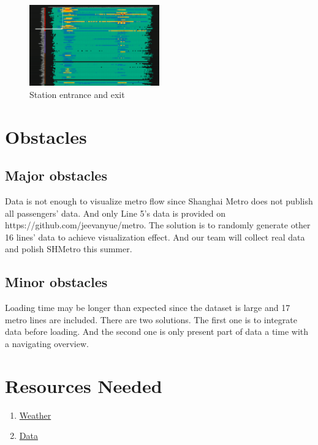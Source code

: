 \documentclass{proc}
\begin{document}
\begin{figure}[t]
	\centering
	\includegraphics[width=0.5\textwidth]{img/p2}
	\caption{Station entrance and exit}
	\label{fig:curve}
\end{figure}
\section{Obstacles}

\subsection{Major obstacles} %
Data is not enough to visualize metro flow since Shanghai Metro does not publish all passengers’ data. And only Line 5’s data is provided on https://github.com/jeevanyue/metro. The solution is to randomly generate other 16 lines’ data to achieve visualization effect. And our team will collect real data and polish SHMetro this summer.



\subsection{Minor obstacles}
Loading time may be longer than expected since the dataset is large and 17 metro lines are included. There are two solutions. The first one is to integrate data before loading. And the second one is only present part of data a time with a navigating overview.

\section{Resources Needed}
\begin{enumerate}
	\item \href{https://www.wunderground.com/history/daily/ZSSS/}{Weather}
	\item \href{https://github.com/jeevanyue/metro}{Data}
\end{enumerate}
\end{document}
